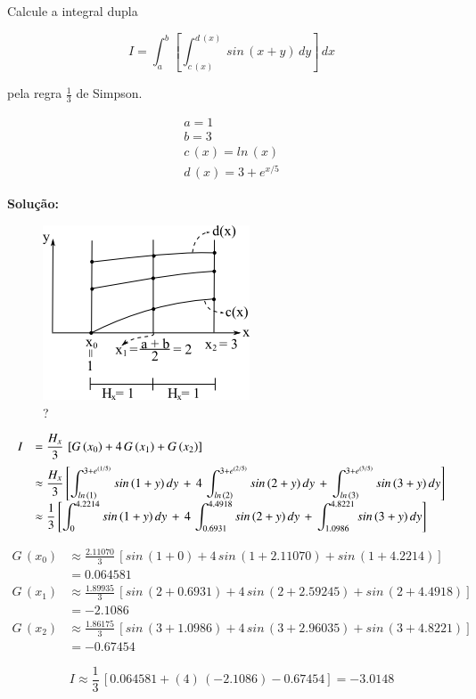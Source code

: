 \begin{example}
 Calcule a integral dupla

\[
 I = \int_a^b \left[ \int_{c\,(x)}^{d\,(x)} \, sin\,(x+y) \, dy \right] \, dx
\]

pela regra $\displaystyle \frac{1}{3}$ de Simpson.

\[
 \begin{array}{l}
  a = 1 \\
  b = 3 \\
  c\,(x) = ln\,(x) \\
  d\,(x) = 3 + e^{x/5}
 \end{array}
\]

\textbf{Solução:}

\begin{figure}[htb]
 \centering
 \includegraphics[scale=1.0]{capitulos/capitulo2/figuras/int_num_dom_bid2.png}
 \caption{?}
 \label{fig:int_num_dom_bid2}
\end{figure}

\[
 \begin{array}{ll}
  I & = \displaystyle \frac{H_x}{3} \, \left[ G\,(x_0) + 4\,G\,(x_1) + G\,(x_2) \right] \vspace*{0.2cm} \\
    & \approx \displaystyle \frac{H_x}{3} \left[ \int_{ln\,(1)}^{3+e^{(1/5)}} sin\,(1+y)\,dy \, + \, 4\,\int_{ln\,(2)}^{3+e^{(2/5)}} sin\,(2+y)\,dy \, + \, \int_{ln\,(3)}^{3+e^{(3/5)}} sin\,(3+y)\,dy \right] \\
    & \approx \displaystyle \frac{1}{3} \left[ \int_0^{4.2214} sin\,(1+y)\,dy \, + \, 4\,\int_{0.6931}^{4.4918} sin\,(2+y)\,dy \, + \, \int_{1.0986}^{4.8221} sin\,(3+y)\,dy \right]
 \end{array}
\]

\[
 \begin{array}{ll}
  G\,(x_0) & \approx \displaystyle \frac{2.11070}{3} \, \left[ sin\,(1+0) + 4\,sin\,(1+2.11070) + sin\,(1+4.2214) \right] \\
           & = 0.064581 \\
  G\,(x_1) & \approx \displaystyle \frac{1.89935}{3} \, \left[ sin\,(2+0.6931) + 4\,sin\,(2+2.59245) + sin\,(2+4.4918) \right] \\
           & = -2.1086 \\
  G\,(x_2) & \approx \displaystyle \frac{1.86175}{3} \, \left[ sin\,(3+1.0986) + 4\,sin\,(3+2.96035) + sin\,(3+4.8221) \right] \\
           & = -0.67454
 \end{array}
\]

\[
 I \approx \frac{1}{3} \, \left[ 0.064581 + (4)\,(-2.1086) - 0.67454 \right] = -3.0148
\]

\end{example}